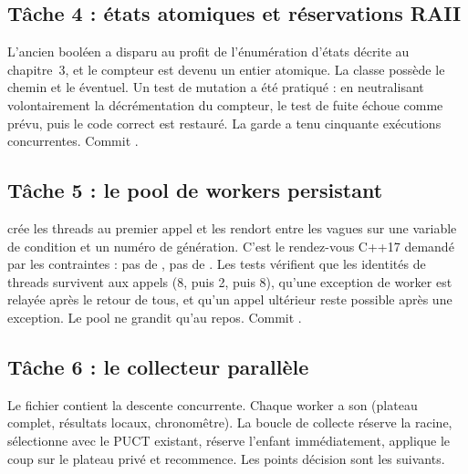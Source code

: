 \subsection{T\^ache 4 : \'etats atomiques et r\'eservations RAII}
\label{sec:t4}

L'ancien bool\'een  a disparu au profit de
l'\'enum\'eration d'\'etats d\'ecrite au chapitre~3, et le compteur
 est devenu un entier atomique. La classe
 poss\`ede le chemin et le  \'eventuel.
Un test de mutation a \'et\'e pratiqu\'e : en neutralisant volontairement la
d\'ecr\'ementation du compteur, le test de fuite \'echoue comme pr\'evu, puis
le code correct est restaur\'e. La garde a tenu cinquante ex\'ecutions
concurrentes. Commit .

\subsection{T\^ache 5 : le pool de workers persistant}
\label{sec:t5}

 cr\'ee les threads au premier appel et les rendort
entre les vagues sur une variable de condition et un num\'ero de
g\'en\'eration. C'est le rendez-vous C++17 demand\'e par les contraintes : pas
de , pas de . Les tests v\'erifient que
les identit\'es de threads survivent aux appels (8, puis 2, puis 8), qu'une
exception de worker est relay\'ee apr\`es le retour de tous, et qu'un appel
ult\'erieur reste possible apr\`es une exception. Le pool ne grandit qu'au
repos. Commit .

\subsection{T\^ache 6 : le collecteur parall\`ele}
\label{sec:t6}

Le fichier \allowbreak{} contient la descente
concurrente. Chaque
worker a son  (plateau complet, r\'esultats locaux,
chronom\^etre). La boucle de collecte r\'eserve la racine, s\'electionne avec
le PUCT existant, r\'eserve l'enfant imm\'ediatement, applique le coup sur le
plateau priv\'e et recommence. Les points d\'ecision sont les suivants.

